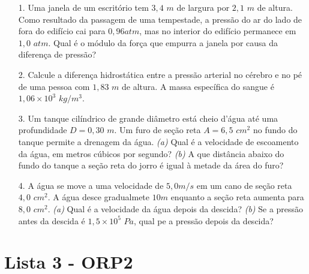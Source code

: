 \begin{itemize}
\item[1.] \textbf{\cite{Halliday2009vol2}} Uma janela de um escritório tem $3,4$ $m$ de largura por $2,1$ $m$ de altura. Como resultado da passagem de uma tempestade, a pressão do ar do lado de fora do edifício cai para $0,96 atm$, mas no interior do edifício permanece em $1,0$ $atm$. Qual é o módulo da força que empurra a janela por causa da diferença de pressão?


\item[2.] \textbf{\cite{Halliday2009vol2}} Calcule a diferença hidrostática entre a pressão arterial no cérebro e no pé de uma pessoa com $1,83$ $m$ de altura. A massa específica do sangue é $1,06 \times 10^3$ $kg/m^3$.


\item[3.] \textbf{\cite{Halliday2009vol2}} Um tanque cilíndrico de grande diâmetro está cheio d'água até uma profundidade $D  =0,30 $ $m$. Um furo de seção reta $A = 6,5$ $cm^2$ no fundo do tanque permite a drenagem da água. \textit{(a)} Qual é a velocidade de escoamento da água, em metros cúbicos por segundo? \textit{(b)} A que distância abaixo do fundo do tanque a seção reta do jorro é igual à metade da área do furo?


\item[4.] \textbf{\cite{Halliday2009vol2}} A água se move a uma velocidade de $5,0 m/s$ em um cano de seção reta $4,0$ $cm^2$. A água desce gradualmete $10 m$ enquanto a seção reta aumenta para $8,0$ $cm^2$. \textit{(a)} Qual é a velocidade da água depois da descida? \textit{(b)} Se a pressão antes da descida é $1,5 \times 10^5$ $Pa$, qual pe a pressão depois da descida?

\end{itemize}
\newpage
\section{Lista 3 - ORP2} \label{ch:orp2l3}

